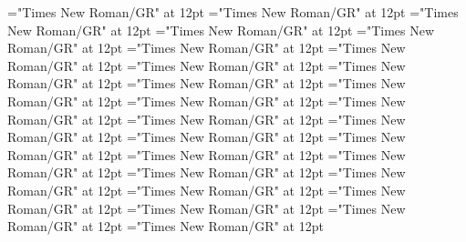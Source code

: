 \documentclass[a4paper]{article}
\begin{document}
\pagestyle{plain}
\sloppy
\setlength{\parfillskip}{0pt plus 1fil}
\font{}="Times New Roman/GR" at 12pt
\font{}="Times New Roman/GR" at 12pt
\font{}="Times New Roman/GR" at 12pt
\font\entryletDatadicBody="Times New Roman/GR" at 12pt
\font\headwordsehentryletDatadicBody="Times New Roman/GR" at 12pt
\font\xhomographnumberptheadwordsehentryletDatadicBody="Times New Roman/GR" at 12pt
\font\sensesentryletDatadicBody="Times New Roman/GR" at 12pt
\font\sensesensesentryletDatadicBody="Times New Roman/GR" at 12pt
\font\xsensenumberLcensensesensesentryletDatadicBody="Times New Roman/GR" at 12pt
\font\grammaticalinfosensesensesentryletDatadicBody="Times New Roman/GR" at 12pt
\font\partofspeechptgrammaticalinfosensesensesentryletDatadicBody="Times New Roman/GR" at 12pt
\font\slotsgrammaticalinfosensesensesentryletDatadicBody="Times New Roman/GR" at 12pt
\font\xitemslotsgrammaticalinfosensesensesentryletDatadicBody="Times New Roman/GR" at 12pt
\font\slotnameptxitemslotsgrammaticalinfosensesensesentryletDatadicBody="Times New Roman/GR" at 12pt
\font{}="Times New Roman/GR" at 12pt
\font\xitemptdefinitionLbptsensesensesentryletDatadicBody="Times New Roman/GR" at 12pt
\font\xlanguagetagenxitemptdefinitionLbptsensesensesentryletDatadicBody="Times New Roman/GR" at 12pt
\font\xitemendefinitionLbptsensesensesentryletDatadicBody="Times New Roman/GR" at 12pt
\font\xlanguagetagenxitemendefinitionLbptsensesensesentryletDatadicBody="Times New Roman/GR" at 12pt
\font\slotnameptslotsgrammaticalinfosensesensesentryletDatadicBody="Times New Roman/GR" at 12pt
\font\relationantonymptsensesensesentryletDatadicBody="Times New Roman/GR" at 12pt
\font\xitemptrelationantonymptsensesensesentryletDatadicBody="Times New Roman/GR" at 12pt
\font\xlanguagetagenxitemptrelationantonymptsensesensesentryletDatadicBody="Times New Roman/GR" at 12pt
\font\xitemenrelationantonymptsensesensesentryletDatadicBody="Times New Roman/GR" at 12pt
\font\xlanguagetagenxitemenrelationantonymptsensesensesentryletDatadicBody="Times New Roman/GR" at 12pt
\font\xsensenumberLbensensesensesentryletDatadicBody="Times New Roman/GR" at 12pt

\mbox{} 
\newpage 
\newpage 
\setcounter{page}{1} 
\pagestyle{fancy} 

\end{document}
